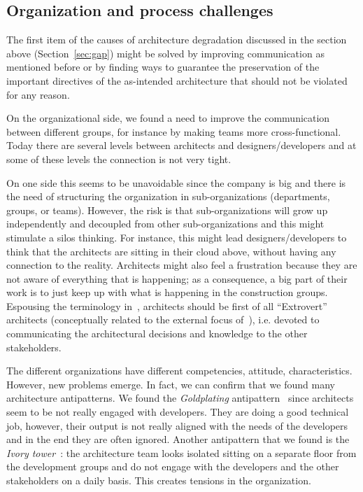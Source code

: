 \subsection{Organization and process challenges}
The first item of the causes of architecture degradation discussed in the section above (Section~\ref{sec:gap}) might be solved by improving communication as mentioned before or by finding ways to guarantee the preservation of the  important directives of the as-intended architecture that should not be violated for any reason.

On the organizational side, we found a need to improve the communication between
different groups, for instance by making teams more cross-functional. Today
there are several levels between architects and designers/developers and at some of
these levels the connection is not very tight. 

On one side this seems to be unavoidable since the company is 
big and there is the need of structuring the organization in sub-organizations (departments, groups, or teams). 
However, the risk is that sub-organizations will grow up independently and decoupled from other sub-organizations and this might 
stimulate a silos thinking.  
For instance, this might lead designers/developers to think
that the architects are sitting in their cloud above, without having
any connection to the reality. Architects might also feel
a frustration because they are not aware of everything that is happening; as a
consequence, a big part of their work is to just keep up with what is happening
in the construction groups. Espousing the terminology
in~\cite{IEEESoftwarePatrizio,whatindustrywants}, architects should be first of all
``Extrovert'' architects (conceptually related to the external focus
of~\cite{Kruchten2008}), i.e. devoted to communicating the architectural
decisions and knowledge to the other stakeholders. 

The different organizations have different competencies, attitude,
characteristics. However, new problems emerge. In fact, we can confirm that we
found many architecture antipatterns. We found the {\em Goldplating}
antipattern~\cite{Kruchten2008} since architects seem to be not
really engaged with developers. They are doing a good technical job, however,
their output is not really aligned with the needs of the developers and in the
end they are often ignored. Another antipattern that we found is the {\em Ivory
tower}~\cite{Kruchten2008}: the architecture team looks isolated
sitting on a separate floor from the development groups and do not engage with the
developers and the other stakeholders on a daily basis. This creates tensions in
the organization. 

